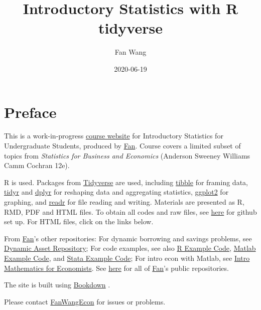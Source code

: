 \documentclass[
]{book}
\title{Introductory Statistics with R tidyverse}
\author{Fan Wang}
\date{2020-06-19}
\begin{document}
\maketitle

{
\hypersetup{linkcolor=}
\setcounter{tocdepth}{1}
\tableofcontents
}
\hypertarget{preface}{%
\chapter*{Preface}\label{preface}}

This is a work-in-progress \href{https://fanwangecon.github.io/Stat4Econ/}{course website} for Introductory Statistics for Undergraduate Students, produced by \href{https://fanwangecon.github.io/}{Fan}. Course covers a limited subset of topics from \emph{Statistics for Business and Economics} (Anderson Sweeney Williams Camm Cochran 12e).

R is used. Packages from \href{https://www.tidyverse.org/}{Tidyverse} \citep{R-tidyverse} are used, including \href{https://tibble.tidyverse.org/}{tibble} \citep{R-tibble} for framing data, \href{https://dplyr.tidyverse.org/}{tidyr} \citep{R-tidyr} and \href{https://dplyr.tidyverse.org/}{dplyr} \citep{R-dplyr} for reshaping data and aggregating statistics, \href{https://ggplot2.tidyverse.org/}{ggplot2} \citep{R-ggplot2} for graphing, and \href{https://readr.tidyverse.org/}{readr} \citep{R-readr} for file reading and writing. Materials are presented as R, RMD, PDF and HTML files. To obtain all codes and raw files, see \href{https://fanwangecon.github.io/Stat4Econ/docs/gitsetup.html}{here} for github set up. For HTML files, click on the links below.

From \href{https://fanwangecon.github.io/}{Fan}'s other repositories: For dynamic borrowing and savings problems, see \href{https://fanwangecon.github.io/CodeDynaAsset/}{Dynamic Asset Repository}; For code examples, see also \href{https://fanwangecon.github.io/R4Econ/}{R Example Code}, \href{https://fanwangecon.github.io/M4Econ/}{Matlab Example Code}, and \href{https://fanwangecon.github.io/Stata4Econ/}{Stata Example Code}; For intro econ with Matlab, see \href{https://fanwangecon.github.io/Math4Econ/}{Intro Mathematics for Economists}. See \href{https://github.com/FanWangEcon}{here} for all of \href{https://fanwangecon.github.io/}{Fan}'s public repositories.

The site is built using \href{https://bookdown.org/}{Bookdown} \citep{R-bookdown}.

Please contact \href{https://fanwangecon.github.io/}{FanWangEcon} for issues or problems.
\end{document}
